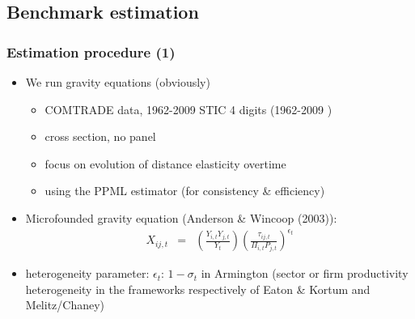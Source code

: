 \documentclass{beamer}
\begin{document}
\subsection{Benchmark estimation}
\begin{frame}\frametitle{Estimation procedure (1)}
\begin{itemize}
	\item We run gravity equations (obviously)
	\begin{itemize}
		\item COMTRADE data, 1962-2009 STIC 4 digits (1962-2009 )
		\item cross section, no panel
		\item focus on evolution of distance elasticity overtime
		\item using the PPML estimator (for consistency \& efficiency)
	\end{itemize}
\item Microfounded gravity equation (Anderson \& Wincoop (2003)):
\begin{eqnarray}
X_{ij,t} & = & \left(\frac{Y_{i,t}Y_{j,t}}{Y_t}\right)\left(\frac{\tau_{ij,t}}{\Pi_{i,t}P_{j,t}}\right)^{\epsilon_t} \nonumber
\end{eqnarray}
\item heterogeneity parameter: $\epsilon_t$: $1-\sigma_{t}$ in Armington (sector or firm productivity heterogeneity in the frameworks respectively of Eaton \& Kortum and Melitz/Chaney)
\end{itemize}
\end{frame}
\end{document}
